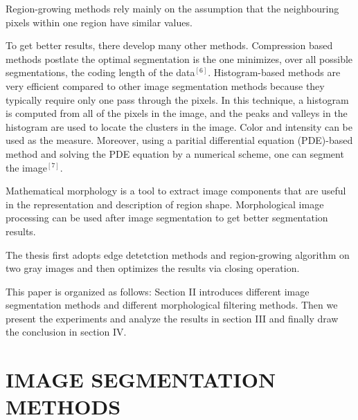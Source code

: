 \documentclass[journal]{IEEEtran}
\begin{document}
Region-growing methods rely mainly on the assumption that the neighbouring pixels within one region have similar values.

To get better results, there develop many other methods. Compression based methods postlate the optimal segmentation is the one minimizes, over all possible segmentations, the coding length of the data$ ^{[6]} $. Histogram-based methods are very efficient compared to other image segmentation methods because they typically require only one pass through the pixels. In this technique, a histogram is computed from all of the pixels in the image, and the peaks and valleys in the histogram are used to locate the clusters in the image. Color and intensity can be used as the measure. Moreover, using a paritial differential equation (PDE)-based method and solving the PDE equation by a numerical scheme, one can segment the image$ ^{[7]} $.

Mathematical morphology is a tool to extract image components that are useful in the representation and description of region shape. Morphological image processing can be used after image segmentation to get better segmentation results.

The thesis first adopts edge detetction methods and region-growing algorithm on two gray images and then optimizes the results via closing operation.

This paper is organized as follows: Section II introduces different image segmentation methods and different morphological filtering methods. Then we present the experiments and analyze the results in section III and finally draw the conclusion in section IV.



\section{IMAGE SEGMENTATION METHODS}
\end{document}

